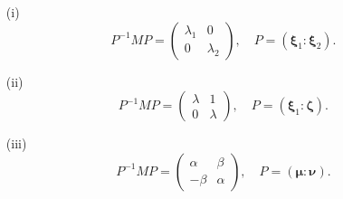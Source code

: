 \documentclass[12pt, a4paper]{article}
\begin{document}
\begin{itemize}

	\item[(i)] $$P^{-1}MP=\begin{pmatrix} \lambda_1&0\\0&\lambda_2 \end{pmatrix}, \quad P=(\bm{\xi}_1:\bm{\xi}_2).$$

	\item[(ii)] $$P^{-1}MP=\begin{pmatrix} \lambda&1\\0&\lambda \end{pmatrix}, \quad P=(\bm{\xi}_1:\bm{\zeta}).$$

	\item[(iii)] $$P^{-1}MP=\begin{pmatrix} \alpha&\beta\\-\beta&\alpha \end{pmatrix}, \quad P=(\bm{\mu}:\bm{\nu}).$$

\end{itemize}




\end{document}
